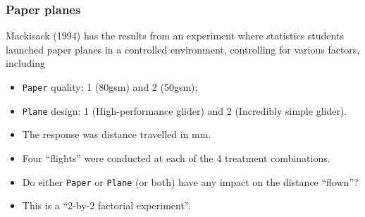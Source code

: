\documentclass[a4paper]{article}\usepackage[]{graphicx}\usepackage[]{xcolor}
\begin{document}
\subsubsection{Paper planes}
Mackisack (1994) has the results from an experiment where statistics students launched paper planes in a controlled environment, controlling for various factors, including
\begin{itemize}
	\item \lstinline|Paper| quality: 1 (80gsm) and 2 (50gsm);
	\item \lstinline|Plane| design: 1 (High-performance glider) and 2 (Incredibly simple glider).
	\item The response was distance travelled in mm.
	\item Four ``flights'' were conducted at each of the 4 treatment combinations.
	\item Do either \lstinline|Paper| or \lstinline|Plane| (or both) have any impact on the distance ``flown''?
	\item This is a ``2-by-2 factorial experiment''.
\end{itemize}
\end{document}
